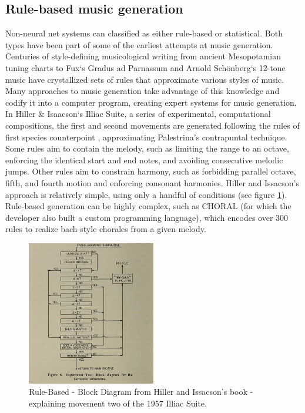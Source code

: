 \subsection{Rule-based music generation}
Non-neural net systems can classified as either rule-based or statistical. Both types have been part of some of the earliest attempts at music generation. Centuries of style-defining musicological writing from ancient Mesopotamian tuning charts \cite{Mirelman_2013} to Fux`s Gradus ad Parnassum \cite{Fux_1725} and Arnold Schönberg`s 12-tone music have crystallized sets of rules that approximate various styles of music. Many approaches to music generation take advantage of this knowledge and codify it into a computer program, creating expert systems for music generation. In Hiller \& Isaacson`s Illiac Suite, a series of experimental, computational compositions, the first and second movements are generated following the rules of first species counterpoint \cite{Fux_1725}, approximating Palestrina's contrapuntal technique. Some rules aim to contain the melody, such as limiting the range to an octave, enforcing the identical start and end notes, and avoiding consecutive melodic jumps. Other rules aim to constrain harmony, such as forbidding parallel octave, fifth, and fourth motion and enforcing consonant harmonies. Hiller and Issacson's approach is relatively simple, using only a handful of conditions (see figure \ref{fig:hillerissacson}). Rule-based generation can be highly complex, such as CHORAL \cite{Ebcioğlu_1994} (for which the developer also built a custom programming language), which encodes over 300 rules to realize bach-style chorales from a given melody. 

\begin{figure}[H]
    \centering
    \includegraphics[width=0.5\textwidth]{IMAGES/IlliacRuleBased.jpg} 
    \caption{Rule-Based - Block Diagram from Hiller and Issacson’s book  - explaining movement two of the 1957 Illiac Suite. }
    \label{fig:hillerissacson}
\end{figure}

